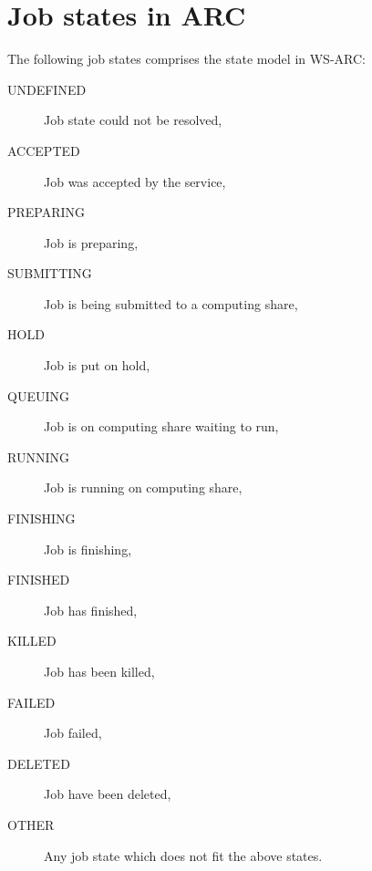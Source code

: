 \documentclass{article}
\begin{document}
\section{Job states in ARC}
The following job states comprises the state model in WS-ARC:
\begin{description}
\item[UNDEFINED] Job state could not be resolved,
\item[ACCEPTED] Job was accepted by the service,
\item[PREPARING] Job is preparing,
\item[SUBMITTING] Job is being submitted to a computing share,
\item[HOLD] Job is put on hold,
\item[QUEUING] Job is on computing share waiting to run,
\item[RUNNING] Job is running on computing share,
\item[FINISHING] Job is finishing,
\item[FINISHED] Job has finished,
\item[KILLED] Job has been killed,
\item[FAILED] Job failed,
\item[DELETED] Job have been deleted,
\item[OTHER] Any job state which does not fit the above states.
\end{description}
\end{document}
